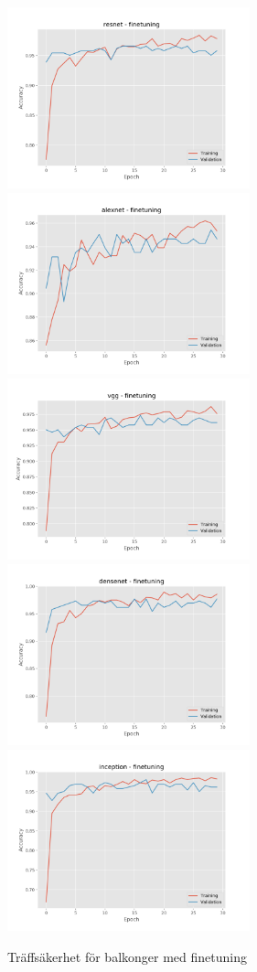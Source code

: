 \documentclass[]{kththesis}
\begin{document}
\begin{figure}[h]
  \includegraphics[width=7cm]{b_a_resnet_fine}
  \includegraphics[width=7cm]{b_a_alexnet_fine}
  \includegraphics[width=7cm]{b_a_vgg_fine}
  \includegraphics[width=7cm]{b_a_densenet_fine}
  \includegraphics[width=7cm]{b_a_inception_fine}
  \caption{Träffsäkerhet för balkonger med finetuning}
  \label{fig:b_a_2}
\end{figure}
\end{document}
